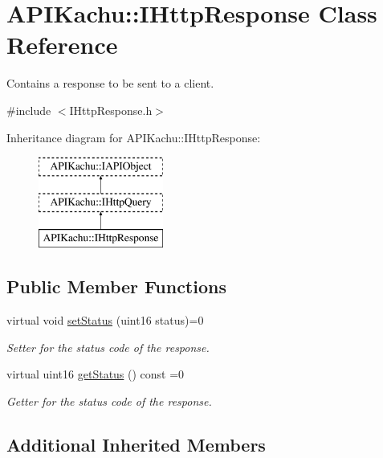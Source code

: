 \hypertarget{class_a_p_i_kachu_1_1_i_http_response}{}\section{A\+P\+I\+Kachu\+:\+:I\+Http\+Response Class Reference}
\label{class_a_p_i_kachu_1_1_i_http_response}


Contains a response to be sent to a client.  




{\ttfamily \#include $<$I\+Http\+Response.\+h$>$}

Inheritance diagram for A\+P\+I\+Kachu\+:\+:I\+Http\+Response\+:\begin{figure}[H]
\begin{center}
\leavevmode
\includegraphics[height=3.000000cm]{class_a_p_i_kachu_1_1_i_http_response}
\end{center}
\end{figure}
\subsection*{Public Member Functions}
\begin{DoxyCompactItemize}
\item 
virtual void \hyperlink{class_a_p_i_kachu_1_1_i_http_response_a9ade9f1dda4f365140c71699b7b15d7d}{set\+Status} (uint16 status)=0
\begin{DoxyCompactList}\small\item\em Setter for the status code of the response. \end{DoxyCompactList}\item 
virtual uint16 \hyperlink{class_a_p_i_kachu_1_1_i_http_response_a1f4ff13d6f6d85d216777c7c88dc0d29}{get\+Status} () const  =0
\begin{DoxyCompactList}\small\item\em Getter for the status code of the response. \end{DoxyCompactList}\end{DoxyCompactItemize}
\subsection*{Additional Inherited Members}


